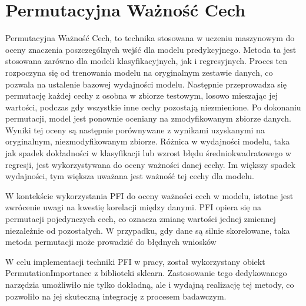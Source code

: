 \documentclass[a4paper,twoside,12pt]{book}
\begin{document}
\section{Permutacyjna Ważność Cech}
Permutacyjna Ważność Cech, to technika stosowana w uczeniu maszynowym do oceny znaczenia poszczególnych wejść dla modelu predykcyjnego. Metoda ta jest stosowana zarówno dla modeli klasyfikacyjnych, jak i regresyjnych. Proces ten rozpoczyna się od trenowania modelu na oryginalnym zestawie danych, co pozwala na ustalenie bazowej wydajności modelu. Następnie przeprowadza się permutację każdej cechy z osobna w zbiorze testowym, losowo mieszając jej wartości, podczas gdy wszystkie inne cechy pozostają niezmienione. Po dokonaniu permutacji, model jest ponownie oceniany na zmodyfikowanym zbiorze danych. Wyniki tej oceny są następnie porównywane z wynikami uzyskanymi na oryginalnym, niezmodyfikowanym zbiorze. Różnica w wydajności modelu, taka jak spadek dokładności w klasyfikacji lub wzrost błędu średniokwadratowego w regresji, jest wykorzystywana do oceny ważności danej cechy. Im większy spadek wydajności, tym większa uważana jest ważność tej cechy dla modelu.

W kontekście wykorzystania PFI do oceny ważności cech w modelu, istotne jest zwrócenie uwagi na kwestię korelacji między danymi. PFI opiera się na permutacji pojedynczych cech, co oznacza zmianę wartości jednej zmiennej niezależnie od pozostałych. W przypadku, gdy dane są silnie skorelowane, taka metoda permutacji może prowadzić do błędnych wniosków

W celu implementacji techniki PFI w pracy, został wykorzystany obiekt PermutationImportance z biblioteki sklearn. Zastosowanie tego dedykowanego narzędzia umożliwiło nie tylko dokładną, ale i wydajną realizację tej metody, co pozwoliło na jej skuteczną integrację z procesem badawczym.
\end{document}
